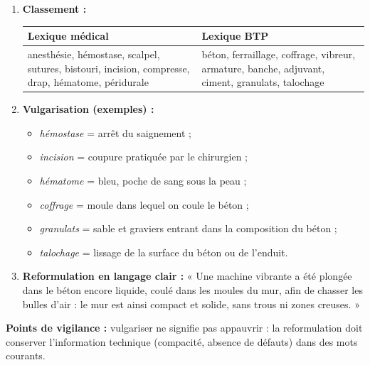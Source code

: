 \documentclass[11pt]{article}
\begin{document}
\begin{corrige}
\begin{enumerate}
\item \textbf{Classement :}
\begin{center}
\begin{tabularx}{\linewidth}{|X|X|}
\hline
\rowcolor{popblueL} \textbf{Lexique médical} & \textbf{Lexique BTP} \\
\hline
anesthésie, hémostase, scalpel, sutures, bistouri, incision, compresse, drap, hématome, péridurale & béton, ferraillage, coffrage, vibreur, armature, banche, adjuvant, ciment, granulats, talochage \\
\hline
\end{tabularx}
\end{center}
\item \textbf{Vulgarisation (exemples) :}
\begin{itemize}
\item \emph{hémostase} = arrêt du saignement ;
\item \emph{incision} = coupure pratiquée par le chirurgien ;
\item \emph{hématome} = bleu, poche de sang sous la peau ;
\item \emph{coffrage} = moule dans lequel on coule le béton ;
\item \emph{granulats} = sable et graviers entrant dans la composition du béton ;
\item \emph{talochage} = lissage de la surface du béton ou de l'enduit.
\end{itemize}
\item \textbf{Reformulation en langage clair :} « Une machine vibrante a été plongée dans le béton encore liquide, coulé dans les moules du mur, afin de chasser les bulles d'air : le mur est ainsi compact et solide, sans trous ni zones creuses. »
\end{enumerate}
\textbf{Points de vigilance :} vulgariser ne signifie pas appauvrir : la reformulation doit conserver l'information technique (compacité, absence de défauts) dans des mots courants.
\end{corrige}
\end{document}
